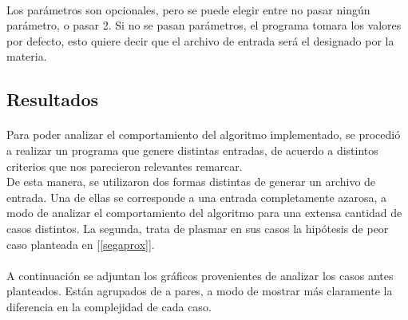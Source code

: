 \paragraph{}
Los parámetros son opcionales, pero se puede elegir entre no pasar ningún parámetro, o pasar 2. Si no se pasan parámetros, el programa tomara los valores por defecto, esto quiere decir que el archivo de entrada será el designado por la materia.


\subsection{Resultados}
\label{resultadosej3}

\paragraph{}
Para poder analizar el comportamiento del algoritmo implementado, se procedió a realizar un programa que genere distintas entradas, de acuerdo a distintos criterios que nos parecieron relevantes remarcar.\\
De esta manera, se utilizaron dos formas distintas de generar un archivo de entrada. Una de ellas se corresponde a una entrada completamente azarosa, a modo de analizar el comportamiento del algoritmo para una extensa cantidad de casos distintos. La segunda, trata de plasmar en sus casos la hipótesis de peor caso planteada en [\ref{segaprox}].

\paragraph{}
A continuación se adjuntan los gráficos provenientes de analizar los casos antes planteados. Están agrupados de a pares, a modo de mostrar más claramente la diferencia en la complejidad de cada caso.



